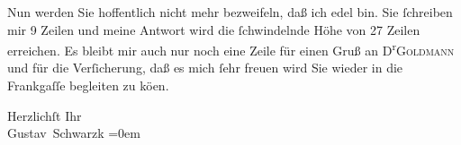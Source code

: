 \pstart
           Nun werden Sie hoffentlich nicht mehr bezweifeln, daß ich edel bin. Sie{ }ſchreiben mir
               9 Zeilen und meine Antwort wird die{ }ſchwindelnde Höhe von 27 Zeilen erreichen. Es
               bleibt mir auch nur noch eine Zeile für einen Gruß an D\textsuperscript{r}\textsc{Goldmann} und für die Verſicherung, daß es mich{ }ſehr freuen wird Sie wieder in die Frankgaſſe begleiten zu kö{\geminationn}en.\pend
           
\pstart
           Herzlichſt Ihr{\\[\baselineskip]}\spacefill\mbox{Gustav Schwarzk}\pend
           \leftskip=0em{}\endnumbering{}
\begin{anhang}
\end{anhang}\newcommand{\dateiname}{L04283}\newcommand{\titel}{Gustav Schwarzkopf an Arthur Schnitzler, 3. 5. 1897}\newcommand{\editorInnen}{Herausgegeben von Jahnke, SelmaMüller, Martin Anton}
